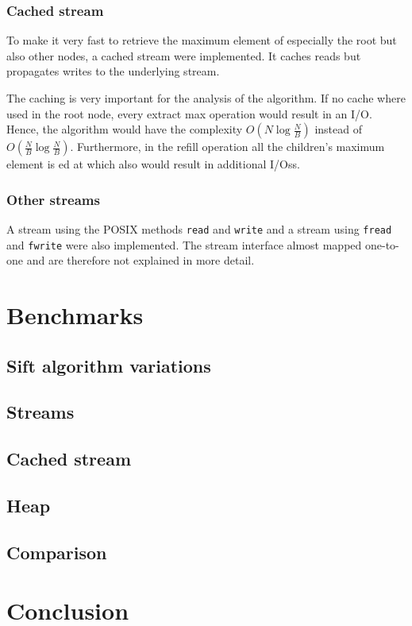 \documentclass[a4paper,12pt]{article}
\begin{document}

\subsubsection{Cached stream}

To make it very fast to retrieve the maximum element of especially the root but also other nodes, a cached stream were implemented. It caches reads but propagates writes to the underlying stream.

The caching is very important for the analysis of the algorithm. If no cache where used in the root node, every extract max operation would result in an I/O. Hence, the algorithm would have the complexity $O(N\log \frac{N}{B})$ instead of $O(\frac{N}{B}\log \frac{N}{B})$. Furthermore, in the refill operation all the children's maximum element is ed at which also would result in additional I/Oss.

\subsubsection{Other streams}

A stream using the POSIX methods \texttt{read} and \texttt{write} and a stream using \texttt{fread} and \texttt{fwrite} were also implemented. The stream interface almost mapped one-to-one and are therefore not explained in more detail.

\section{Benchmarks}

\subsection{Sift algorithm variations}

\subsection{Streams}


\subsection{Cached stream}

\subsection{Heap}


\subsection{Comparison}

\section{Conclusion}


\clearpage{}
\end{document}
